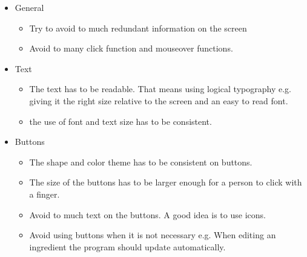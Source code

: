 \begin{itemize}
	\item General
		\begin{itemize}
			\item Try to avoid to much redundant information on the screen
			\item Avoid to many click function and mouseover functions.
		\end{itemize}
	\item Text
		\begin{itemize}
			\item The text has to be readable. That means using logical typography e.g. giving it the right size relative to the screen and an easy to read font.	
			\item the use of font and text size has to be consistent.
		\end{itemize}
	\item Buttons
		\begin{itemize}
			\item The shape and color theme has to be consistent on buttons.
			\item The size of the buttons has to be larger enough for a person to click with a finger.
			\item Avoid to much text on the buttons. A good idea is to use icons.
			\item Avoid using buttons when it is not necessary e.g. When editing an ingredient the program should update automatically.
		\end{itemize}
\end{itemize}    

